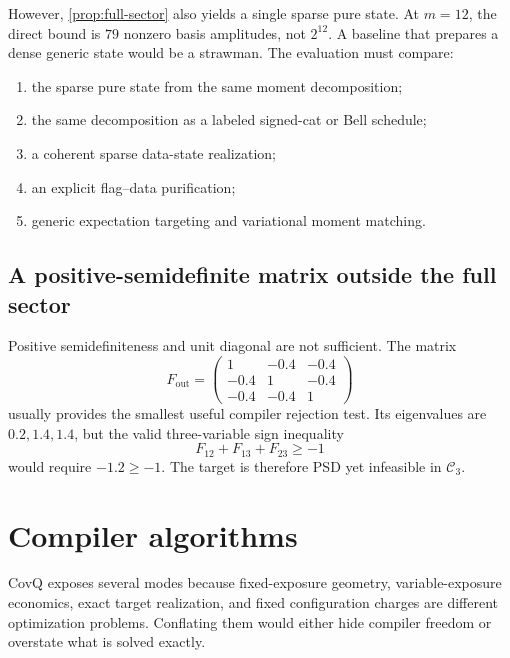 \documentclass[11pt]{article}
\theoremstyle{definition}
\theoremstyle{remark}
\begin{document}
However, \cref{prop:full-sector} also yields a single sparse pure state. At $m=12$, the direct bound is $79$ nonzero basis amplitudes, not $2^{12}$. A baseline that prepares a dense generic state would be a strawman. The evaluation must compare:
\begin{enumerate}[label=(\roman*)]
  \item the sparse pure state from the same moment decomposition;
  \item the same decomposition as a labeled signed-cat or Bell schedule;
  \item a coherent sparse data-state realization;
  \item an explicit flag--data purification;
  \item generic expectation targeting and variational moment matching.
\end{enumerate}

\subsection{A positive-semidefinite matrix outside the full sector}
Positive semidefiniteness and unit diagonal are not sufficient. The matrix
\begin{equation}
  F_{\mathrm{out}}=
  \begin{pmatrix}
  1&-0.4&-0.4\\
  -0.4&1&-0.4\\
  -0.4&-0.4&1
  \end{pmatrix}
  \label{eq:full-infeasible-example}
\end{equation}
usually provides the smallest useful compiler rejection test. Its eigenvalues are $0.2,1.4,1.4$, but the valid three-variable sign inequality
\begin{equation}
  F_{12}+F_{13}+F_{23}\ge-1
\end{equation}
would require $-1.2\ge-1$. The target is therefore PSD yet infeasible in $\mathcal C_3$.


\section{Compiler algorithms}
\label{sec:algorithms}

CovQ exposes several modes because fixed-exposure geometry, variable-exposure economics, exact target realization, and fixed configuration charges are different optimization problems. Conflating them would either hide compiler freedom or overstate what is solved exactly.
\end{document}
